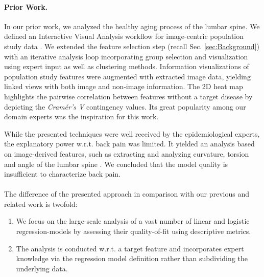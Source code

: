 \documentclass[journal]{style/vgtc} 			          %
\begin{document}
\paragraph{Prior Work.}
In our prior work, we analyzed the healthy aging process of the lumbar spine.
We defined an Interactive Visual Analysis workflow for image-centric population study data \cite{Klemm2014VIS}.
We extended the feature selection step (recall Sec. \ref{sec:Background}) with an iterative analysis loop incorporating group selection and visualization using expert input as well as clustering methods.
Information visualizations of population study features were augmented with extracted image data, yielding linked views with both image and non-image information.
The 2D heat map \cite{Klemm2014VIS} highlights the pairwise correlation between features without a target disease by depicting the \emph{Cram\'{e}r's V} contingency values.
Its great popularity among our domain experts was the inspiration for this work.

While the presented techniques were well received by the epidemiological experts, the explanatory power w.r.t. back pain was limited.
It yielded an analysis based on image-derived features, such as extracting and analyzing curvature, torsion and angle of the lumbar spine \cite{Klemm2015}.
We concluded that the model quality is insufficient to characterize back pain.
\\\\
The difference of the presented approach in comparison with our previous and related work is twofold:
\begin{enumerate}
	\item We focus on the large-scale analysis of a vast number of linear and logistic regression-models by assessing their quality-of-fit using descriptive metrics.
	\item The analysis is conducted w.r.t. a target feature and incorporates expert knowledge via the regression model definition rather than subdividing the underlying data.
\end{enumerate}
\end{document}

